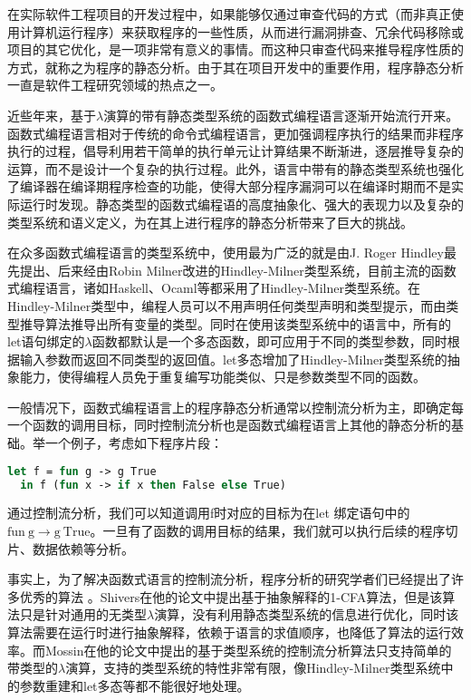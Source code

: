 \documentclass[UTF8, colorlinks]{pkuthss}
\begin{document}
	在实际软件工程项目的开发过程中，如果能够仅通过审查代码的方式（而非真正使用计算机运行程序）来获取程序的一些性质，从而进行漏洞排查、冗余代码移除或项目的其它优化，是一项非常有意义的事情。而这种只审查代码来推导程序性质的方式，就称之为程序的静态分析。由于其在项目开发中的重要作用，程序静态分析一直是软件工程研究领域的热点之一。
	
	近些年来，基于$\lambda$演算的带有静态类型系统的函数式编程语言逐渐开始流行开来。函数式编程语言相对于传统的命令式编程语言，更加强调程序执行的结果而非程序执行的过程，倡导利用若干简单的执行单元让计算结果不断渐进，逐层推导复杂的运算，而不是设计一个复杂的执行过程。此外，语言中带有的静态类型系统也强化了编译器在编译期程序检查的功能，使得大部分程序漏洞可以在编译时期而不是实际运行时发现。静态类型的函数式编程语的高度抽象化、强大的表现力以及复杂的类型系统和语义定义，为在其上进行程序的静态分析带来了巨大的挑战。
	
	在众多函数式编程语言的类型系统中，使用最为广泛的就是由J. Roger Hindley最先提出\cite{Hindley}、后来经由Robin Milner改进\cite{Milner}的Hindley-Milner类型系统，目前主流的函数式编程语言，诸如Haskell、Ocaml等都采用了Hindley-Milner类型系统。在Hindley-Milner类型中，编程人员可以不用声明任何类型声明和类型提示，而由类型推导算法推导出所有变量的类型。同时在使用该类型系统中的语言中，所有的let语句绑定的$\lambda$函数都默认是一个多态函数，即可应用于不同的类型参数，同时根据输入参数而返回不同类型的返回值。let多态增加了Hindley-Milner类型系统的抽象能力，使得编程人员免于重复编写功能类似、只是参数类型不同的函数。
	
	一般情况下，函数式编程语言上的程序静态分析通常以控制流分析为主，即确定每一个函数的调用目标，同时控制流分析也是函数式编程语言上其他的静态分析的基础。举一个例子，考虑如下程序片段：
	\begin{lstlisting}[language=Ocaml]
  let f = fun g -> g True
  in f (fun x -> if x then False else True)
	\end{lstlisting}
	通过控制流分析，我们可以知道调用f时对应的目标为在let 绑定语句中的$\mathrm{fun}\ \mathrm{g} \to \mathrm{g}\ \mathrm{True}$。一旦有了函数的调用目标的结果，我们就可以执行后续的程序切片、数据依赖等分析。
	
	事实上，为了解决函数式语言的控制流分析，程序分析的研究学者们已经提出了许多优秀的算法	。Shivers在他的论文中提出基于抽象解释的1-CFA算法\cite{Shivers}，但是该算法只是针对通用的无类型$\lambda$演算，没有利用静态类型系统的信息进行优化，同时该算法需要在运行时进行抽象解释，依赖于语言的求值顺序，也降低了算法的运行效率。而Mossin在他的论文中提出的基于类型系统的控制流分析算法只支持简单的带类型的$\lambda$演算，支持的类型系统的特性非常有限，像Hindley-Milner类型系统中的参数重建和let多态等都不能很好地处理。
\end{document}
